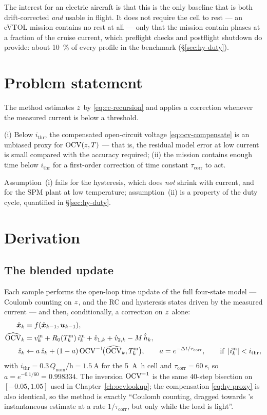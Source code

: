 The interest for an electric aircraft is that this is the only baseline that is both drift-corrected
\emph{and} usable in flight. It does not require the cell to rest --- an eVTOL mission contains no
rest at all --- only that the mission contain phases at a fraction of the cruise current, which
preflight checks and postflight shutdown do provide: about \SI{10}{\percent} of every profile in the
benchmark (\S\ref{sec:hy-duty}).

\section{Problem statement}
The method estimates $z$ by \eqref{eq:cc-recursion} and applies a correction whenever the
measured current is below a threshold.
\begin{assumption}\label{as:hy-all}
(i) Below $i_{\text{thr}}$, the compensated open-circuit voltage \eqref{eq:ocv-compensate} is an
unbiased proxy for $\mathrm{OCV}(z,T)$ --- that is, the residual model error at low current is small
compared with the accuracy required; (ii) the mission contains enough time below $i_{\text{thr}}$
for a first-order correction of time constant $\tau_{\text{corr}}$ to act.
\end{assumption}
Assumption~(i) fails for the hysteresis, which does \emph{not} shrink with current, and for the
SPM plant at low temperature; assumption~(ii) is a property of the duty cycle, quantified in
\S\ref{sec:hy-duty}.

\section{Derivation}

\subsection{The blended update}
Each sample performs the open-loop time update of the full four-state model --- Coulomb counting on
$z$, and the RC and hysteresis states driven by the measured current --- and then, conditionally,
a correction on $z$ alone:
\begin{align}
\hat{\bm{x}}_k &= f(\hat{\bm{x}}_{k-1}, \bm{u}_{k-1}), \label{eq:hy-predict}\\
\widehat{\mathrm{OCV}}_k &= v^{\text{m}}_k + R_0(T^{\text{m}}_k)\,i^{\text{m}}_k
 + \hat v_{1,k} + \hat v_{2,k} - M\,\hat h_k, \label{eq:hy-proxy}\\
\hat{z}_k &\gets a\,\hat{z}_k + (1-a)\,\mathrm{OCV}^{-1}\!\bigl(\widehat{\mathrm{OCV}}_k, T^{\text{m}}_k\bigr),
 \qquad a = e^{-\Delta t/\tau_{\text{corr}}},
 \qquad\text{if } \left\lvert i^{\text{m}}_k \right\rvert < i_{\text{thr}}, \label{eq:hy-correct}
\end{align}
with $i_{\text{thr}} = 0.3\,Q_{\text{nom}}/\si{\hour} = \SI{1.5}{\ampere}$ for the
\SI{5}{\ampere\hour} cell and $\tau_{\text{corr}} = \SI{60}{\second}$, so
$a = e^{-0.1/60} = 0.998334$. The inversion $\mathrm{OCV}^{-1}$ is the same 40-step bisection on
$[-0.05,1.05]$ used in Chapter~\ref{ch:ocvlookup}; the compensation \eqref{eq:hy-proxy} is
also identical, so the method is exactly ``Coulomb counting, dragged towards 's
instantaneous estimate at a rate $1/\tau_{\text{corr}}$, but only while the load is light''.

